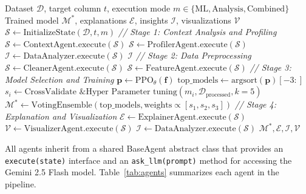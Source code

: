 \documentclass{article}
\begin{document}
\begin{algorithm}[H]
\caption{Data Pilot AI Pro: End-to-End Pipeline Orchestration}
\label{alg:pipeline}
\begin{algorithmic}[1]
\REQUIRE Dataset $\mathcal{D}$, target column $t$, execution mode $m \in \{\text{ML}, \text{Analysis}, \text{Combined}\}$
\ENSURE Trained model $\mathcal{M}^*$, explanations $\mathcal{E}$, insights $\mathcal{I}$, visualizations $\mathcal{V}$
\STATE $\mathcal{S} \leftarrow \text{InitializeState}(\mathcal{D}, t, m)$
\STATE \textit{// Stage 1: Context Analysis and Profiling}
\STATE $\mathcal{S} \leftarrow \text{ContextAgent.execute}(\mathcal{S})$ 
\STATE $\mathcal{S} \leftarrow \text{ProfilerAgent.execute}(\mathcal{S})$ 
    \STATE $\mathcal{I} \leftarrow \text{DataAnalyzer.execute}(\mathcal{S})$
    \RETURN $\mathcal{I}$
\ENDIF
\STATE \textit{// Stage 2: Data Preprocessing}
\STATE $\mathcal{S} \leftarrow \text{CleanerAgent.execute}(\mathcal{S})$ 
\STATE $\mathcal{S} \leftarrow \text{FeatureAgent.execute}(\mathcal{S})$ 
\STATE \textit{// Stage 3: Model Selection and Training}
\STATE $\mathbf{p} \leftarrow \text{PPO}_\theta(\mathbf{f})$ 
\STATE $\text{top\_models} \leftarrow \text{argsort}(\mathbf{p})[-3:]$
    \STATE $s_i \leftarrow \text{CrossValidate \& Hyper Parameter tuning}(m_i, \mathcal{D}_{\text{processed}}, k=5)$
\ENDFOR
\STATE $\mathcal{M}^* \leftarrow \text{VotingEnsemble}(\text{top\_models}, \text{weights} \propto [s_1, s_2, s_3])$
\STATE \textit{// Stage 4: Explanation and Visualization}
\STATE $\mathcal{E} \leftarrow \text{ExplainerAgent.execute}(\mathcal{S})$ 
\STATE $\mathcal{V} \leftarrow \text{VisualizerAgent.execute}(\mathcal{S})$ 
    \STATE $\mathcal{I} \leftarrow \text{DataAnalyzer.execute}(\mathcal{S})$
\ENDIF
\RETURN $\mathcal{M}^*, \mathcal{E}, \mathcal{I}, \mathcal{V}$
\end{algorithmic}
\end{algorithm}


All agents inherit from a shared BaseAgent abstract class that provides an 
\texttt{execute(state)} interface and an \texttt{ask\_llm(prompt)} method for 
accessing the Gemini 2.5 Flash model. Table~\ref{tab:agents} 
summarizes each agent in the pipeline.
\end{document}
